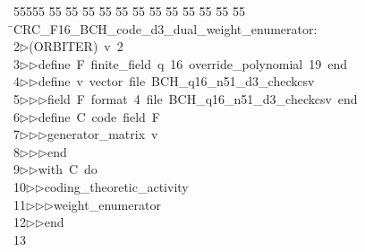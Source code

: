%
%
\begin{tabbing}
55555 \= 55 \= 55 \= 55 \= 55 \= 55 \= 55 \= 55 \= 55 \= 55 \= 55 \= 55 \= 55 \= \>CRC\_F16\_BCH\_code\_d3\_dual\_weight\_enumerator:\\[0pt]
2\>$\triangleright$\>(ORBITER)\ v\ 2\ \\[0pt]
3\>$\triangleright$\>$\triangleright$\>define\ F\ finite\_field\ q\ 16\ override\_polynomial\ 19\ end\ \\[0pt]
4\>$\triangleright$\>$\triangleright$\>define\ v\ vector\ file\ BCH\_q16\_n51\_d3\_checkcsv\ \\[0pt]
5\>$\triangleright$\>$\triangleright$\>$\triangleright$\>field\ F\ format\ 4\ file\ BCH\_q16\_n51\_d3\_checkcsv\ end\ \\[0pt]
6\>$\triangleright$\>$\triangleright$\>define\ C\ code\ field\ F\ \\[0pt]
7\>$\triangleright$\>$\triangleright$\>$\triangleright$\>generator\_matrix\ v\ \\[0pt]
8\>$\triangleright$\>$\triangleright$\>$\triangleright$\>end\ \\[0pt]
9\>$\triangleright$\>$\triangleright$\>with\ C\ do\ \\[0pt]
10\>$\triangleright$\>$\triangleright$\>coding\_theoretic\_activity\ \\[0pt]
11\>$\triangleright$\>$\triangleright$\>$\triangleright$\>weight\_enumerator\ \\[0pt]
12\>$\triangleright$\>$\triangleright$\>end\\[0pt]
13\>\end{tabbing}
